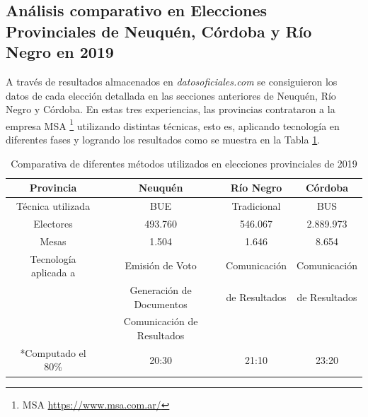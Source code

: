 \subsection{Análisis comparativo en Elecciones Provinciales de Neuquén, Córdoba y Río Negro en 2019}
\label{analisisComparativoProvincial}
A través de resultados almacenados en \textit{datosoficiales.com} se consiguieron los datos de cada elección detallada en las secciones anteriores de Neuquén, Río Negro y Córdoba.   \newline
En estas tres experiencias, las provincias contrataron a la empresa MSA \footnote{MSA \url{https://www.msa.com.ar/}} utilizando distintas técnicas, esto es, aplicando tecnología en diferentes fases y logrando los resultados como se muestra en la Tabla \ref{tab:comparativa}.
\begin{table}[]
    \centering
    \begin{tabular}{|c|c|c|c|}
        \hline
         Provincia & Neuquén& Río Negro & Córdoba   \\
         \hline
         Técnica utilizada& BUE & Tradicional & BUS \\
         \hline
         Electores& 493.760 & 546.067 & 2.889.973 \\
         \hline
         Mesas& 1.504 & 1.646 & 8.654\\
         \hline
         Tecnología aplicada a& Emisión de Voto &Comunicación & Comunicación \\
         & Generación de Documentos & de Resultados &  de Resultados\\
         & Comunicación de Resultados & & \\
         \hline
         *Computado el 80\% & 20:30 & 21:10 & 23:20\\
         \hline
    \end{tabular}
    \caption{Comparativa de diferentes métodos utilizados en elecciones provinciales de 2019}
    \label{tab:comparativa}
\end{table}


